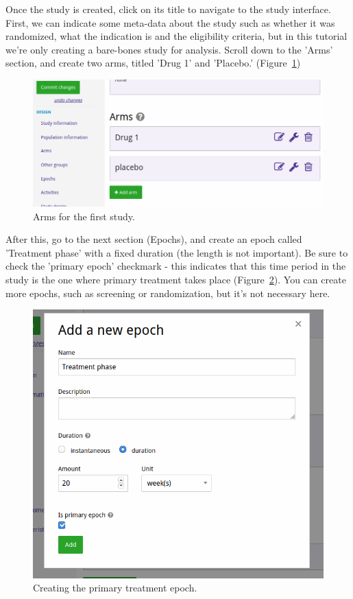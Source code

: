 \documentclass[12pt]{article}
\begin{document}
Once the study is created, click on its title to navigate to the study interface. First, we can indicate some meta-data about the study such as whether it was randomized, what the indication is and the eligibility criteria, but in this tutorial we're only creating a bare-bones study for analysis. Scroll down to the 'Arms' section, and create two arms, titled 'Drug 1' and 'Placebo.' (Figure~\ref{fig:arms})

\begin{figure}[!htbp]
  \centering
  \includegraphics[width=\textwidth]{img/arms.png}
  \caption{Arms for the first study.}
\label{fig:arms}
\end{figure}

After this, go to the next section (Epochs), and create an epoch called 'Treatment phase' with a fixed duration (the length is not important). 
Be sure to check the 'primary epoch' checkmark - this indicates that this time period in the study is the one where primary treatment takes place (Figure~\ref{fig:createMainPhase}). 
You can create more epochs, such as screening or randomization, but it's not necessary here.

\begin{figure}[!htbp]
  \centering
  \includegraphics[width=\textwidth]{img/createMainPhase.png}
  \caption{Creating the primary treatment epoch.}
\label{fig:createMainPhase}
\end{figure}
\end{document}
